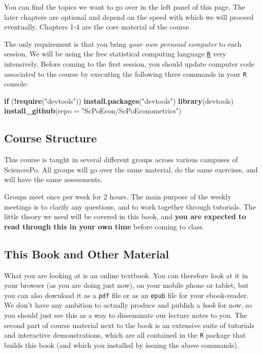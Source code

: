 \documentclass[]{book}
\newenvironment{Shaded}{\begin{snugshade}}{\end{snugshade}}
\newcommand{\KeywordTok}[1]{\textcolor[rgb]{0.13,0.29,0.53}{\textbf{#1}}}
\newcommand{\DataTypeTok}[1]{\textcolor[rgb]{0.13,0.29,0.53}{#1}}
\newcommand{\StringTok}[1]{\textcolor[rgb]{0.31,0.60,0.02}{#1}}
\newcommand{\ControlFlowTok}[1]{\textcolor[rgb]{0.13,0.29,0.53}{\textbf{#1}}}
\newcommand{\OperatorTok}[1]{\textcolor[rgb]{0.81,0.36,0.00}{\textbf{#1}}}
\newcommand{\NormalTok}[1]{#1}
\theoremstyle{definition}
\theoremstyle{definition}
\theoremstyle{definition}
\theoremstyle{remark}
\begin{document}
You can find the topics we want to go over in the left panel of this
page. The later chapters are optional and depend on the speed with which
we will proceed eventually. Chapters 1-4 are the core material of the
course.

The only requirement is that you bring \emph{your own personal computer}
to each session. We will be using the free statistical computing
language \href{https://www.r-project.org}{\texttt{R}} very intensively.
Before coming to the first session, you should update computer code
associated to the course by executing the following three commands in
your \texttt{R} console:

\begin{Shaded}
\begin{Highlighting}[]
\ControlFlowTok{if}\NormalTok{ (}\OperatorTok{!}\KeywordTok{require}\NormalTok{(}\StringTok{"devtools"}\NormalTok{)) }\KeywordTok{install.packages}\NormalTok{(}\StringTok{"devtools"}\NormalTok{)}
\KeywordTok{library}\NormalTok{(devtools)}
\KeywordTok{install_github}\NormalTok{(}\DataTypeTok{repo =} \StringTok{"ScPoEcon/ScPoEconometrics"}\NormalTok{)}
\end{Highlighting}
\end{Shaded}

\subsection*{Course Structure}\label{course-structure}

This course is taught in several different groups across various
campuses of SciencesPo. All groups will go over the same material, do
the same exercises, and will have the same assessments.

Groups meet once per week for 2 hours. The main purpose of the weekly
meetings is to clarify any questions, and to work together through
tutorials. The little theory we need will be covered in this book, and
\textbf{you are expected to read through this in your own time} before
coming to class.

\subsection*{This Book and Other
Material}\label{this-book-and-other-material}

What you are looking at is an online textbook. You can therefore look at
it in your browser (as you are doing just now), on your mobile phone or
tablet, but you can also download it as a \texttt{pdf} file or as an
\texttt{epub} file for your ebook-reader. We don't have any ambition to
actually produce and publish a \emph{book} for now, so you should just
see this as a way to disseminate our lecture notes to you. The second
part of course material next to the book is an extensive suite of
tutorials and interactive demonstrations, which are all contained in the
\texttt{R} package that builds this book (and which you installed by
issuing the above commands).
\end{document}
